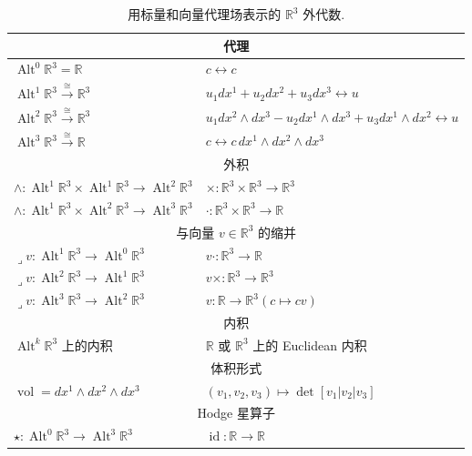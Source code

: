 \begin{table}[htbp]\centering\footnotesize
\caption{{用标量和向量代理场表示的 $\mathbb R^3$ 外代数.}}\label{tab:exterior-algebra-r3}
\setlength{\tabcolsep}{4pt}
\begin{tabular}{l|l}\hline
\multicolumn{2}{c}{{代理}}\\\hline
$\operatorname{Alt}^0\mathbb R^3=\mathbb R$&$c\leftrightarrow c$\\
$\operatorname{Alt}^1\mathbb R^3\xrightarrow{\cong}\mathbb R^3$&$u_1dx^1+u_2dx^2+u_3dx^3\leftrightarrow u$\\
$\operatorname{Alt}^2\mathbb R^3\xrightarrow{\cong}\mathbb R^3$&$u_1dx^2\wedge dx^3-u_2dx^1\wedge dx^3+u_3dx^1\wedge dx^2\leftrightarrow u$\\
$\operatorname{Alt}^3\mathbb R^3\xrightarrow{\cong}\mathbb R$&$c\leftrightarrow c\,dx^1\wedge dx^2\wedge dx^3$\\\hline
\multicolumn{2}{c}{{外积}}\\\hline
$\wedge:\operatorname{Alt}^1\mathbb R^3\times\operatorname{Alt}^1\mathbb R^3\to\operatorname{Alt}^2\mathbb R^3$&$\times:\mathbb R^3\times\mathbb R^3\to\mathbb R^3$\\
$\wedge:\operatorname{Alt}^1\mathbb R^3\times\operatorname{Alt}^2\mathbb R^3\to\operatorname{Alt}^3\mathbb R^3$&$\cdot:\mathbb R^3\times\mathbb R^3\to\mathbb R$\\\hline
\multicolumn{2}{c}{{与向量 $v\in\mathbb R^3$ 的缩并}}\\\hline
$\lrcorner v:\operatorname{Alt}^1\mathbb R^3\to\operatorname{Alt}^0\mathbb R^3$&$v\cdot:\mathbb R^3\to\mathbb R$\\
$\lrcorner v:\operatorname{Alt}^2\mathbb R^3\to\operatorname{Alt}^1\mathbb R^3$&$v\times:\mathbb R^3\to\mathbb R^3$\\
$\lrcorner v:\operatorname{Alt}^3\mathbb R^3\to\operatorname{Alt}^2\mathbb R^3$&$v:\mathbb R\to\mathbb R^3$\quad$(c\mapsto cv)$\\\hline
\multicolumn{2}{c}{{内积}}\\\hline
{$\operatorname{Alt}^k\mathbb R^3$ 上的内积}&{$\mathbb R$ 或 $\mathbb R^3$ 上的 Euclidean 内积}\\\hline
\multicolumn{2}{c}{{体积形式}}\\\hline
$\operatorname{vol}=dx^1\wedge dx^2\wedge dx^3$&$(v_1,v_2,v_3)\mapsto\det[v_1|v_2|v_3]$\\\hline
\multicolumn{2}{c}{Hodge {星算子}}\\\hline
$\star:\operatorname{Alt}^0\mathbb R^3\to\operatorname{Alt}^3\mathbb R^3$&$\operatorname{id}:\mathbb R\to\mathbb R$\\

\end{tabular}
\end{table}
